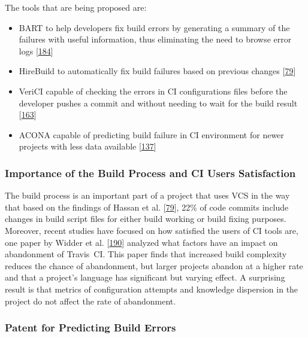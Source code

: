 \documentclass[]{book}
\providecommand{\tightlist}{%
  \setlength{\itemsep}{0pt}\setlength{\parskip}{0pt}}
\begin{document}
The tools that are being proposed are:

\begin{itemize}
\tightlist
\item
  BART to help developers fix build errors by generating a summary of
  the failures with useful information, thus eliminating the need to
  browse error logs {[}\protect\hyperlink{ref-vassallo2018break}{184}{]}
\item
  HireBuild to automatically fix build failures based on previous
  changes {[}\protect\hyperlink{ref-hassan2018hirebuild}{79}{]}
\item
  VeriCI capable of checking the errors in CI configurations files
  before the developer pushes a commit and without needing to wait for
  the build result
  {[}\protect\hyperlink{ref-santolucito2018statically}{163}{]}
\item
  ACONA capable of predicting build failure in CI environment for newer
  projects with less data available
  {[}\protect\hyperlink{ref-ni2018acona}{137}{]}
\end{itemize}

\subsubsection{Importance of the Build Process and CI Users
Satisfaction}\label{importance-of-the-build-process-and-ci-users-satisfaction}

The build process is an important part of a project that uses VCS in the
way that based on the findings of Hassan et al.
{[}\protect\hyperlink{ref-hassan2018hirebuild}{79}{]}, 22\% of code
commits include changes in build script files for either build working
or build fixing purposes. Moreover, recent studies have focused on how
satisfied the users of CI tools are, one paper by Widder et al.
{[}\protect\hyperlink{ref-widder2018m}{190}{]} analyzed what factors
have an impact on abandonment of Travis~CI. This paper finds that
increased build complexity reduces the chance of abandonment, but larger
projects abandon at a higher rate and that a project's language has
significant but varying effect. A surprising result is that metrics of
configuration attempts and knowledge dispersion in the project do not
affect the rate of abandonment.

\subsubsection{Patent for Predicting Build
Errors}\label{patent-for-predicting-build-errors}
\end{document}
